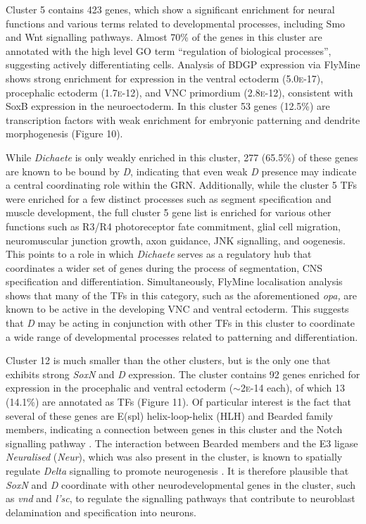 \documentclass[withindex,glossary]{cam-thesis}
\begin{document}
Cluster 5 contains 423 genes, which show a significant enrichment for
neural functions and various terms related to developmental processes,
including Smo and Wnt signalling pathways. Almost 70\% of the genes in
this cluster are annotated with the high level GO term ``regulation of
biological processes'', suggesting actively differentiating cells.
Analysis of BDGP expression via FlyMine  shows strong enrichment for
expression in the ventral ectoderm (5.0\textsc{e}-17), procephalic ectoderm
(1.7\textsc{e}-12), and VNC primordium (2.8\textsc{e}-12), consistent with SoxB expression
in the neuroectoderm. In this cluster 53 genes (12.5\%) are
transcription factors with weak enrichment for embryonic patterning and
dendrite morphogenesis (Figure 10).

While \emph{Dichaete} is only weakly enriched in this cluster, 277
(65.5\%) of these genes are known to be bound by \emph{D}, indicating
that even weak \emph{D} presence may indicate a central coordinating
role within the GRN. Additionally, while the cluster 5 TFs were enriched
for a few distinct processes such as segment specification and muscle
development, the full cluster 5 gene list is enriched for various other
functions such as R3/R4 photoreceptor fate commitment, glial cell
migration, neuromuscular junction growth, axon guidance, JNK signalling,
and oogenesis. This points to a role in which \emph{Dichaete} serves as
a regulatory hub  that coordinates a wider set of
genes during the process of segmentation, CNS specification and
differentiation. Simultaneously, FlyMine localisation analysis shows
that many of the TFs in this category, such as the aforementioned
\emph{opa,} are known to be active in the developing VNC and ventral
ectoderm. This suggests that \emph{D} may be acting in conjunction with
other TFs in this cluster to coordinate a wide range of developmental
processes related to patterning and differentiation.

Cluster 12 is much smaller than the other clusters, but is the only one
that exhibits strong \emph{SoxN} and \emph{D} expression. The cluster
contains 92 genes enriched for expression in the procephalic and ventral
ectoderm ($\sim{}$2\textsc{e}-14 each), of which 13 (14.1\%) are
annotated as TFs (Figure 11). Of particular interest is the fact that
several of these genes are E(spl) helix-loop-helix (HLH) and Bearded
family members, indicating a connection between genes in this cluster
and the Notch signalling pathway . The
interaction between Bearded members and the E3 ligase \emph{Neuralised}
(\emph{Neur}), which was also present in the cluster, is known to
spatially regulate \emph{Delta} signalling to promote neurogenesis
. It is therefore plausible that
\emph{SoxN} and \emph{D} coordinate with other neurodevelopmental genes
in the cluster, such as \emph{vnd} and \emph{l'sc}, to regulate the
signalling pathways that contribute to neuroblast delamination and
specification into neurons.
\end{document}
